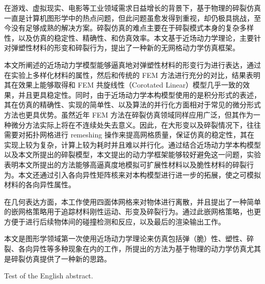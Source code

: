 \begin{cabstract}
在游戏、虚拟现实、电影等工业领域需求日益增长的背景下，基于物理的碎裂仿真一直是计算机图形学中的热点问题，但此问题虽愈发得到重视，却仍极具挑战，至今没有足够成熟的解决方案。碎裂仿真的难点主要在于碎裂模式本身的复杂多样性，以及仿真的稳定性、精确性、和仿真效率。本文基于近场动力学理论，主要针对弹塑性材料的形变和碎裂行为，提出了一种新的无网格动力学仿真框架。

本文所阐述的近场动力学模型能够逼真地对弹塑性材料的形变行为进行表达，通过在实验上多样化材料的属性，然后和传统的 FEM 方法进行充分的对比，结果表明其在效果上能够取得和 FEM 共旋线性（Corotated Linear）模型几乎一致的效果，并且更具稳定性。同时，由于近场动力学本构模型使用的是积分形式的表述，其在仿真的精确性、实现的简单性、以及算法的并行化方面相对于常见的微分形式方法也更具优势。虽然近年 FEM 方法在碎裂仿真领域同样应用广泛，但其作为一种微分方法实际上将在不连续处失去意义。因此，在大形变以及碎裂情况下，往往需要对拓扑网格进行 remeshing 操作来提高网格质量，保证仿真的稳定性，其在实现上较为复杂，计算上较为耗时并且难以并行化。通过结合近场动力学本构模型以及本文所提出的碎裂模型，本文提出的动力学框架能够较好避免这一问题，实验表明本文所提出的方法能够高逼真度地模拟可扩展性材料以及脆性材料的碎裂行为。本文还通过引入各向异性矩阵核来对本构模型进行进一步的拓展，使之可模拟材料的各向异性属性。

在几何表达方面，本工作使用四面体网格来对物体进行离散，并且提出了一种简单的嵌网格策略用于追踪材料刚性运动、形变及碎裂行为。通过此嵌网格策略，也更方便于进行后续物体间的碰撞检测和反应，以及最后的渲染输出工作。

本文是图形学领域第一次使用近场动力学理论来仿真包括弹（脆）性、塑性、碎裂、各向异性等多种现象在内的工作，所提出的方法为基于物理的动力学仿真尤其是碎裂仿真提供了一种新的思路。

\end{cabstract}

\begin{eabstract}
	Test of the English abstract.
\end{eabstract}

